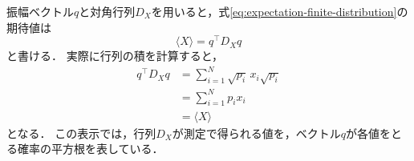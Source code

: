 振幅ベクトル$q$と対角行列$D_X$を用いると，式\eqref{eq:expectation-finite-distribution}の期待値は
\begin{equation}
  \langle X\rangle=q^\top D_X q
  \label{eq:classical-expectation-matrix-form}
\end{equation}
と書ける\cite[p.~94]{schuld2020}．
実際に行列の積を計算すると，
\begin{equation*}
  \begin{aligned}
    q^\top D_X q
    &=\sum_{i=1}^{N}\sqrt{p_i}\,x_i\sqrt{p_i}\\
    &=\sum_{i=1}^{N}p_i x_i\\
    &=\langle X\rangle
  \end{aligned}
\end{equation*}
となる．
この表示では，行列$D_X$が測定で得られる値を，ベクトル$q$が各値をとる確率の平方根を表している．





